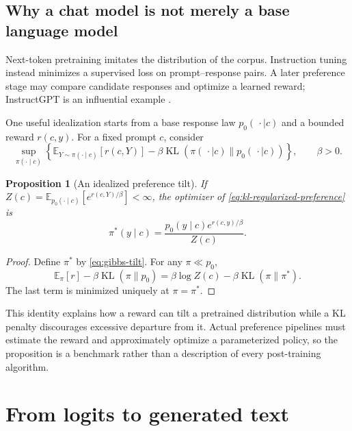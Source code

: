 \documentclass[11pt]{amsart}
\numberwithin{equation}{section}
\theoremstyle{definition}
\theoremstyle{plain}
\newtheorem{proposition}[definition]{Proposition}
\theoremstyle{remark}
\newcommand{\E}{\mathbb{E}}
\DeclareMathOperator{\KL}{KL}
\begin{document}
\subsection{Why a chat model is not merely a base language model}

Next-token pretraining imitates the distribution of the corpus.  Instruction
tuning instead minimizes a supervised loss on prompt--response pairs.  A later
preference stage may compare candidate responses and optimize a learned reward;
InstructGPT is an influential example \cite{OuyangEtAl2022}.

One useful idealization starts from a base response law $p_0(\,\cdot\mid c)$
and a bounded reward $r(c,y)$.  For a fixed prompt $c$, consider
\begin{equation}\label{eq:kl-regularized-preference}
 \sup_{\pi(\cdot\mid c)}
 \left\{
   \E_{Y\sim\pi(\cdot\mid c)}[r(c,Y)]
   -\beta\KL\!\left(
      \pi(\,\cdot\mid c)\|p_0(\,\cdot\mid c)
    \right)
 \right\},
 \qquad \beta>0.
\end{equation}

\begin{proposition}[An idealized preference tilt]
\label{prop:gibbs-tilt}
If
$Z(c)=\E_{p_0(\cdot\mid c)}[e^{r(c,Y)/\beta}]<\infty$, the optimizer of
\eqref{eq:kl-regularized-preference} is
\begin{equation}\label{eq:gibbs-tilt}
 \pi^*(y\mid c)
 =\frac{p_0(y\mid c)e^{r(c,y)/\beta}}{Z(c)}.
\end{equation}
\end{proposition}

\begin{proof}
Define $\pi^*$ by \eqref{eq:gibbs-tilt}.  For any $\pi\ll p_0$,
\[
 \E_\pi[r]-\beta\KL(\pi\|p_0)
 =\beta\log Z(c)-\beta\KL(\pi\|\pi^*).
\]
The last term is minimized uniquely at $\pi=\pi^*$.
\end{proof}

This identity explains how a reward can tilt a pretrained distribution while a
KL penalty discourages excessive departure from it.  Actual preference
pipelines must estimate the reward and approximately optimize a parameterized
policy, so the proposition is a benchmark rather than a description of every
post-training algorithm.


\section{From logits to generated text}
\label{sec:generation}
\end{document}
